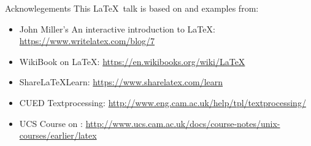 \documentclass[10pt,times]{beamer}
\begin{document}
\begin{frame}{Acknowlegements}
This \LaTeX~talk is based on and examples from:
\begin{itemize}
\item John Miller's An interactive introduction to \LaTeX: 
\href{https://www.writelatex.com/blog/7}{https://www.writelatex.com/blog/7}
\item WikiBook on \LaTeX: 
\href{https://en.wikibooks.org/wiki/LaTeX}{https://en.wikibooks.org/wiki/LaTeX}
\item Share\LaTeX Learn: 
\href{https://www.sharelatex.com/learn}{https://www.sharelatex.com/learn}
\item CUED Textprocessing: \href{http://www.eng.cam.ac.uk/help/tpl/textprocessing/}{http://www.eng.cam.ac.uk/help/tpl/textprocessing/}
\item UCS Course on \LaTeXe: \href{http://www.ucs.cam.ac.uk/docs/course-notes/unix-courses/earlier/latex}{http://www.ucs.cam.ac.uk/docs/course-notes/unix-courses/earlier/latex}
\end{itemize}
\end{frame}
\end{document}
